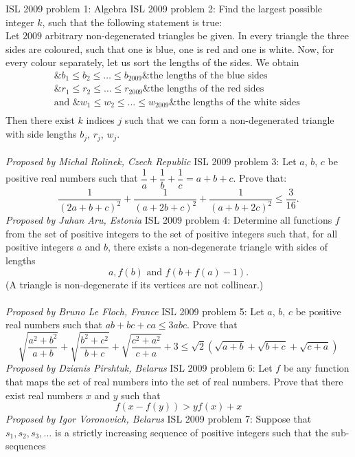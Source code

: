 ISL 2009 problem 1:  Algebra 
ISL 2009 problem 2:  Find the largest possible integer $k$, such that the following statement is true: \\
Let $2009$ arbitrary non-degenerated triangles be given. In every triangle the three sides are coloured, such that one is blue, one is red and one is white. Now, for every colour separately, let us sort the lengths of the sides. We obtain
\[
\left.
\begin{array}{rcl}
 \& b_1 \leq b_2\leq\ldots\leq b_{2009} \& \textrm{the lengths of the blue sides }\\
 \& r_1 \leq r_2\leq\ldots\leq r_{2009} \& \textrm{the lengths of the red sides }\\
 \textrm{and } \& w_1 \leq w_2\leq\ldots\leq w_{2009} \& \textrm{the lengths of the white sides }\\
 \end{array}
\right.
\]
Then there exist $k$ indices $j$ such that we can form a non-degenerated triangle with side lengths $b_j$, $r_j$, $w_j$. \\\\
\textit{Proposed by Michal Rolinek, Czech Republic} 
ISL 2009 problem 3:  Let $a$, $b$, $c$ be positive real numbers such that $\dfrac{1}{a} + \dfrac{1}{b} + \dfrac{1}{c} = a+b+c$. Prove that:
\[ \frac{1}{(2a+b+c)^2}+\frac{1}{(a+2b+c)^2}+\frac{1}{(a+b+2c)^2}\leq \frac{3}{16}. \]
\textit{Proposed by Juhan Aru, Estonia} 
ISL 2009 problem 4:  Determine all functions $ f$ from the set of positive integers to the set of positive integers such that, for all positive integers $ a$ and $ b$, there exists a non-degenerate triangle with sides of lengths
\[ a, f(b) \text{ and } f(b + f(a) - 1). \]
(A triangle is non-degenerate if its vertices are not collinear.) \\\\
\textit{Proposed by Bruno Le Floch, France} 
ISL 2009 problem 5:  Let $a$, $b$, $c$ be positive real numbers such that $ab+bc+ca\leq 3abc$. Prove that
\[
\sqrt{\frac{a^2+b^2}{a+b}}+\sqrt{\frac{b^2+c^2}{b+c}}+\sqrt{\frac{c^2+a^2}{c+a}}+3\leq \sqrt{2}\left(\sqrt{a+b}+\sqrt{b+c}+\sqrt{c+a}\right)
\]
\textit{Proposed by Dzianis Pirshtuk, Belarus} 
ISL 2009 problem 6:  Let $f$ be any function that maps the set of real numbers into the set of real numbers. Prove that there exist real numbers $x$ and $y$ such that
\[ f\left(x-f(y)\right)>yf(x)+x \]
\textit{Proposed by Igor Voronovich, Belarus} 
ISL 2009 problem 7:  Suppose that $ s_1,s_2,s_3, \ldots$ is a strictly increasing sequence of positive integers such that the sub-sequences
